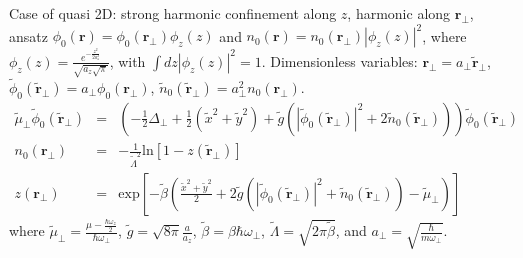 \documentclass[12pt,a4paper]{report}
\newcommand{\abs}[1]{\left|#1\right|}
\renewcommand{\exp}[1]{\textrm{exp}\left[#1\right]}
\renewcommand{\ln}[1]{\textrm{ln}\left[#1\right]}
\begin{document}
Case of quasi 2D: strong harmonic confinement along $z$, harmonic along $\bm{r}_\perp$, ansatz $\phi_0(\bm{r})=\phi_0(\bm{r}_\perp)\phi_z(z)$ and $n_0(\bm{r})=n_0(\bm{r}_\perp)\abs{\phi_z(z)}^2$, where $\phi_z(z)=\frac{e^{-\frac{z^2}{2a_z^2}}}{\sqrt{a_z\sqrt{\pi}}}$, with $\int dz\abs{\phi_z(z)}^2=1$.
Dimensionless variables: $\bm{r}_\perp=a_\perp\tilde{\bm{r}}_\perp$, $\tilde{\phi}_0(\tilde{\bm{r}}_\perp)=a_\perp\phi_0(\bm{r}_\perp)$, $\tilde{n}_0(\tilde{\bm{r}}_\perp)=a_\perp^2n_0(\bm{r}_\perp)$.
\begin{eqnarray*}
\tilde{\mu}_\perp\tilde{\phi}_0(\tilde{\bm{r}}_\perp)
&=&\left(-\frac{1}{2}\Delta_\perp
+\frac{1}{2}(\tilde{x}^2+\tilde{y}^2)
+\tilde{g}
\left(\abs{\tilde{\phi}_0(\tilde{\bm{r}}_\perp)}^2+2\tilde{n}_0(\tilde{\bm{r}}_\perp)\right)\right)
\tilde{\phi}_0(\tilde{\bm{r}}_\perp)\\
n_0(\bm{r}_\perp)&=&-\frac{1}{\tilde{\Lambda}^2}\ln{1-z(\tilde{\bm{r}}_\perp)}\\
z(\bm{r}_\perp)&=&\exp{-\tilde{\beta}\left(\frac{\tilde{x}^2+\tilde{y}^2}{2}+2\tilde{g}\left(\abs{\tilde{\phi}_0(\tilde{\bm{r}}_\perp)}^2
+\tilde{n}_0(\tilde{\bm{r}}_\perp)\right)-\tilde{\mu}_\perp\right)}
\end{eqnarray*}
where $\tilde{\mu}_\perp=\frac{\mu-\frac{\hbar\omega_z}{2}}{\hbar\omega_\perp}$, $\tilde{g}=\sqrt{8\pi}\frac{a}{a_z}$, $\tilde{\beta}=\beta\hbar\omega_\perp$, $\tilde{\Lambda}=\sqrt{2\pi\tilde{\beta}}$, and $a_\perp=\sqrt{\frac{\hbar}{m\omega_\perp}}$.
\end{document}
